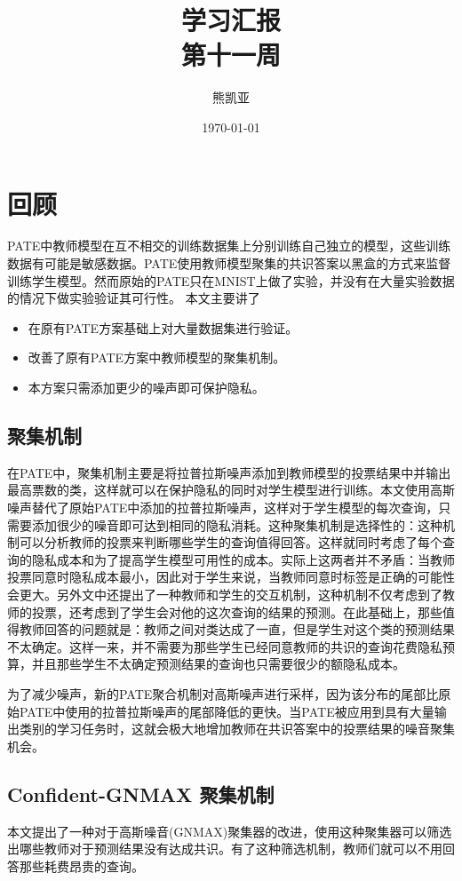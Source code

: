 \documentclass[a4paper]{article}
\title{学习汇报\\第十一周}
\author{熊凯亚}
\date{\today}
\begin{document}
\maketitle
\section{回顾}
PATE中教师模型在互不相交的训练数据集上分别训练自己独立的模型，这些训练数据有可能是敏感数据。PATE使用教师模型聚集的共识答案以黑盒的方式来监督训练学生模型。然而原始的PATE\cite{Papernot2016SemisupervisedKT}只在MNIST上做了实验，并没有在大量实验数据的情况下做实验验证其可行性。
本文主要讲了
\begin{itemize}
\item 在原有PATE方案基础上对大量数据集进行验证。
\item 改善了原有PATE方案中教师模型的聚集机制。
\item 本方案只需添加更少的噪声即可保护隐私。
\end{itemize}

\subsection{聚集机制}

在PATE中，聚集机制主要是将拉普拉斯噪声添加到教师模型的投票结果中并输出最高票数的类，这样就可以在保护隐私的同时对学生模型进行训练。本文使用高斯噪声替代了原始PATE中添加的拉普拉斯噪声，这样对于学生模型的每次查询，只需要添加很少的噪音即可达到相同的隐私消耗。这种聚集机制是选择性的：这种机制可以分析教师的投票来判断哪些学生的查询值得回答。这样就同时考虑了每个查询的隐私成本和为了提高学生模型可用性的成本。实际上这两者并不矛盾：当教师投票同意时隐私成本最小，因此对于学生来说，当教师同意时标签是正确的可能性会更大。另外文中还提出了一种教师和学生的交互机制，这种机制不仅考虑到了教师的投票，还考虑到了学生会对他的这次查询的结果的预测。在此基础上，那些值得教师回答的问题就是：教师之间对类达成了一直，但是学生对这个类的预测结果不太确定。这样一来，并不需要为那些学生已经同意教师的共识的查询花费隐私预算，并且那些学生不太确定预测结果的查询也只需要很少的额隐私成本。

为了减少噪声，新的PATE聚合机制对高斯噪声进行采样，因为该分布的尾部比原始PATE中使用的拉普拉斯噪声的尾部降低的更快。当PATE被应用到具有大量输出类别的学习任务时，这就会极大地增加教师在共识答案中的投票结果的噪音聚集机会。

\subsection{Confident-GNMAX 聚集机制}
本文提出了一种对于高斯噪音(GNMAX)聚集器的改进，使用这种聚集器可以筛选出哪些教师对于预测结果没有达成共识。有了这种筛选机制，教师们就可以不用回答那些耗费昂贵的查询。
\end{document}
